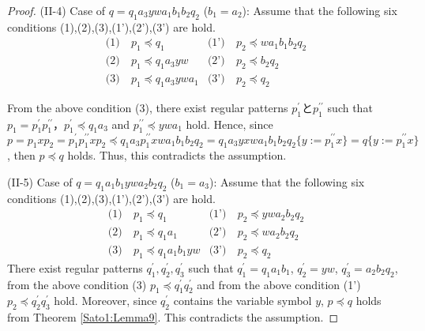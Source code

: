 \begin{proof}
\noindent
(II-4) Case of $q=q_{1}a_{3}ywa_{1}b_{1}b_{2}q_{2}$ ($b_{1}=a_{2}$):
Assume that the following six conditions (1),(2),(3),(1'),(2'),(3') are hold.
\begin{align*}
\textrm{(1)}~& p_{1} \preceq q_{1} & \textrm{(1')}~& p_{2} \preceq wa_{1}b_{1}b_{2}q_{2} \\
\textrm{(2)}~& p_{1} \preceq q_{1}a_{3}yw & \textrm{(2')}~& p_{2} \preceq b_{2}q_{2} \\
\textrm{(3)}~& p_{1} \preceq q_{1}a_{3}ywa_{1} & \textrm{(3')}~& p_{2} \preceq q_{2}
\end{align*}

\noindent
From the above condition (3), there exist regular patterns $p_{1}^{\prime}$と$p_{1}^{\prime\prime}$ such that $p_{1}=p_{1}^{\prime}p_{1}^{\prime\prime}$，$p_{1}^{\prime} \preceq q_{1}a_{3}$ and $p_{1}^{\prime\prime} \preceq ywa_{1}$ hold.
Hence, since $p=p_{1}xp_{2}=p_{1}^{\prime}p_{1}^{\prime\prime}xp_{2}\preceq q_{1}a_{3}p_{1}^{\prime\prime}xwa_{1}b_{1}b_{2}q_{2}=q_{1}a_{3}yxwa_{1}b_{1}b_{2}q_{2}\{ y := p_{1}^{\prime\prime}x \}=q \{ y := p_{1}^{\prime\prime}x \}$, then $p \preceq q$ holds.
Thus, this contradicts the assumption.
\smallskip

\noindent
(II-5) Case of $q=q_{1}a_{1}b_{1}ywa_{2}b_{2}q_{2}$ ($b_{1}=a_{3}$):
Assume that the following six conditions (1),(2),(3),(1'),(2'),(3') are hold.
\begin{align*}
\textrm{(1)}~& p_{1} \preceq q_{1} & \textrm{(1')}~& p_{2} \preceq ywa_{2}b_{2}q_{2} \\
\textrm{(2)}~& p_{1} \preceq q_{1}a_{1} & \textrm{(2')}~& p_{2} \preceq wa_{2}b_{2}q_{2} \\
\textrm{(3)}~& p_{1} \preceq q_{1}a_{1}b_{1}yw & \textrm{(3')}~& p_{2} \preceq q_{2}
\end{align*}
\noindent
There exist regular patterns $q_{1}^{\prime}, q_{2}^{\prime}, q_{3}^{\prime}$ such that $q_{1}^{\prime}=q_{1}a_{1}b_{1}$, $q_{2}^{\prime}=yw$, $q_{3}^{\prime}=a_{2}b_{2}q_{2}$, from the above condition (3) $p_{1} \preceq q_{1}^{\prime}q_{2}^{\prime}$ and from the above condition (1') $p_{2} \preceq q_{2}^{\prime}q_{3}^{\prime}$ hold.
Moreover, since $q_{2}^{\prime}$ contains the variable symbol $y$, $p\preceq q$ holds from Theorem \ref{Sato1:Lemma9}.
This contradicts the assumption.
\end{proof}




